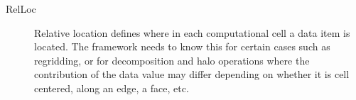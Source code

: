 

\begin{description}

\item [RelLoc] Relative location defines where in each computational
cell a data item is located.  The framework needs to know this for
certain cases such as regridding, or for decomposition and halo
operations where the contribution of the data value may differ
depending on whether it is cell centered, along an edge, a face, etc.

\end{description}



